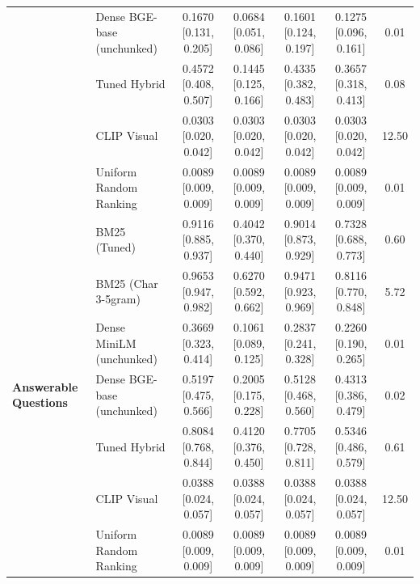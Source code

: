 \documentclass[conference]{IEEEtran}
\begin{document}
\begin{table}[t]
{\begin{tabular}{llccccc}
 & Dense BGE-base (unchunked)& 0.1670 [0.131, 0.205] & 0.0684 [0.051, 0.086] & 0.1601 [0.124, 0.197] & 0.1275 [0.096, 0.161] & 0.01 \\
 & Tuned Hybrid            & 0.4572 [0.408, 0.507] & 0.1445 [0.125, 0.166] & 0.4335 [0.382, 0.483] & 0.3657 [0.318, 0.413] & 0.08 \\
 & CLIP Visual             & 0.0303 [0.020, 0.042] & 0.0303 [0.020, 0.042] & 0.0303 [0.020, 0.042] & 0.0303 [0.020, 0.042] & 12.50 \\
 & Uniform Random Ranking  & 0.0089 [0.009, 0.009] & 0.0089 [0.009, 0.009] & 0.0089 [0.009, 0.009] & 0.0089 [0.009, 0.009] & 0.01 \\
\midrule
\multirow{7}{*}{\textbf{Answerable Questions}}
 & BM25 (Tuned)            & 0.9116 [0.885, 0.937] & 0.4042 [0.370, 0.440] & 0.9014 [0.873, 0.929] & 0.7328 [0.688, 0.773] & 0.60 \\
 & BM25 (Char 3-5gram)     & 0.9653 [0.947, 0.982] & 0.6270 [0.592, 0.662] & 0.9471 [0.923, 0.969] & 0.8116 [0.770, 0.848] & 5.72 \\
 & Dense MiniLM (unchunked)  & 0.3669 [0.323, 0.414] & 0.1061 [0.089, 0.125] & 0.2837 [0.241, 0.328] & 0.2260 [0.190, 0.265] & 0.01 \\
 & Dense BGE-base (unchunked)& 0.5197 [0.475, 0.566] & 0.2005 [0.175, 0.228] & 0.5128 [0.468, 0.560] & 0.4313 [0.386, 0.479] & 0.02 \\
 & Tuned Hybrid            & 0.8084 [0.768, 0.844] & 0.4120 [0.376, 0.450] & 0.7705 [0.728, 0.811] & 0.5346 [0.486, 0.579] & 0.61 \\
 & CLIP Visual             & 0.0388 [0.024, 0.057] & 0.0388 [0.024, 0.057] & 0.0388 [0.024, 0.057] & 0.0388 [0.024, 0.057] & 12.50 \\
 & Uniform Random Ranking  & 0.0089 [0.009, 0.009] & 0.0089 [0.009, 0.009] & 0.0089 [0.009, 0.009] & 0.0089 [0.009, 0.009] & 0.01 \\
\bottomrule
\end{tabular}}
\end{table}
\end{document}
